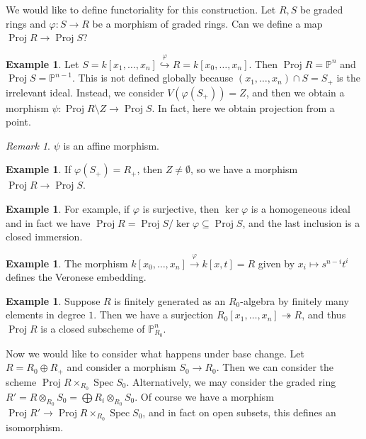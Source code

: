 \documentclass[leqno, openany]{memoir}
\theoremstyle{definition}
\newtheorem{exm}[thm]{Example}
\theoremstyle{remark}
\newtheorem{rmk}[thm]{Remark}
\theoremstyle{plain}
\theoremstyle{definition}
\theoremstyle{remark}
\renewcommand{\P}{\mathbb{P}}
\DeclareMathOperator{\Spec}{Spec}
\DeclareMathOperator{\Proj}{Proj}
\begin{document}
We would like to define functoriality for this construction. Let $R, S$ be graded rings and $\varphi \colon S \to R$ be a morphism of graded rings. Can we define a map $\Proj R \to \Proj S$?

\begin{exm}
    Let $S = k[x_1, \ldots, x_n] \overset{\varphi}{ \hookrightarrow } R = k[x_0, \ldots, x_n]$. Then $\Proj R = \P^n$ and $\Proj S = \P^{n-1}$. This is not defined globally because $(x_1, \ldots, x_n) \cap S = S_+$ is the irrelevant ideal. Instead, we consider $V(\varphi(S_+)) = Z$, and then we obtain a morphism $\psi \colon \Proj R \setminus Z \to \Proj S$. In fact, here we obtain projection from a point.
\end{exm}

\begin{rmk}
    $\psi$ is an affine morphism. 
\end{rmk}

\begin{exm}
    If $\varphi(S_+) = R_+$, then $Z \neq \emptyset$, so we have a morphism $\Proj R \to \Proj S$.
\end{exm}

\begin{exm}
    For example, if $\varphi$ is surjective, then $\ker \varphi$ is a homogeneous ideal and in fact we have $\Proj R = \Proj S/\ker\varphi \subseteq \Proj S$, and the last inclusion is a closed immersion.
\end{exm}

\begin{exm}
    The morphism $k[x_0, \ldots, x_n] \xrightarrow{\varphi} k[x,t] = R$ given by  $x_i \mapsto s^{n-i}t^i$ defines the Veronese embedding.
\end{exm}

\begin{exm}
    Suppose $R$ is finitely generated as an $R_0$-algebra by finitely many elements in degree $1$. Then we have a surjection $R_0[x_1, \ldots, x_n] \twoheadrightarrow R$, and thus $\Proj R$ is a closed subscheme of $\P^n_{R_0}$.
\end{exm}

Now we would like to consider what happens under base change. Let $R = R_0 \oplus R_+$ and consider a morphism $S_0 \to R_0$. Then we can consider the scheme $\Proj R \times_{R_0} \Spec S_0$. Alternatively, we may consider the graded ring $R' = R \otimes_{R_0} S_0 = \bigoplus R_i \otimes_{R_0} S_0$. Of course we have a morphism $\Proj R' \to \Proj R \times_{R_0} \Spec S_0$, and in fact on open subsets, this defines an isomorphism.
\end{document}
